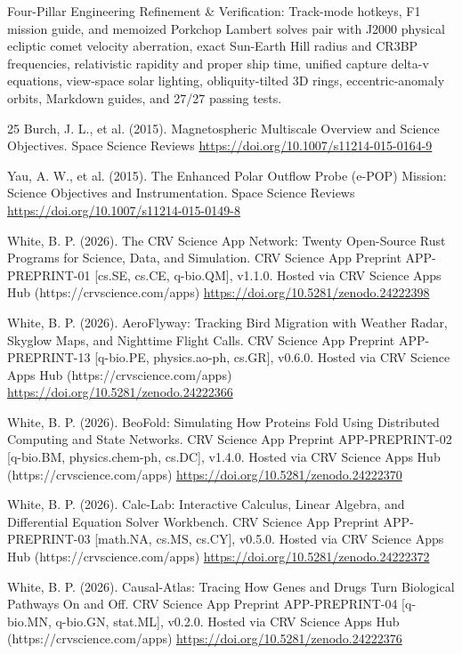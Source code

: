 \documentclass[10pt,letterpaper]{article}
\begin{document}
Four-Pillar Engineering Refinement \& Verification: Track-mode hotkeys, F1 mission guide, and memoized Porkchop Lambert solves pair with J2000 physical ecliptic comet velocity aberration, exact Sun-Earth Hill radius and CR3BP frequencies, relativistic rapidity and proper ship time, unified capture delta-v equations, view-space solar lighting, obliquity-tilted 3D rings, eccentric-anomaly orbits, Markdown guides, and 27/27 passing tests.

\begin{thebibliography}{25}
 Burch, J. L., et al. (2015). Magnetospheric Multiscale Overview and Science Objectives. Space Science Reviews \url{https://doi.org/10.1007/s11214-015-0164-9}

 Yau, A. W., et al. (2015). The Enhanced Polar Outflow Probe (e-POP) Mission: Science Objectives and Instrumentation. Space Science Reviews \url{https://doi.org/10.1007/s11214-015-0149-8}

 White, B. P. (2026). The CRV Science App Network: Twenty Open-Source Rust Programs for Science, Data, and Simulation. CRV Science App Preprint APP-PREPRINT-01 [cs.SE, cs.CE, q-bio.QM], v1.1.0. Hosted via CRV Science Apps Hub (https://crvscience.com/apps) \url{https://doi.org/10.5281/zenodo.24222398}

 White, B. P. (2026). AeroFlyway: Tracking Bird Migration with Weather Radar, Skyglow Maps, and Nighttime Flight Calls. CRV Science App Preprint APP-PREPRINT-13 [q-bio.PE, physics.ao-ph, cs.GR], v0.6.0. Hosted via CRV Science Apps Hub (https://crvscience.com/apps) \url{https://doi.org/10.5281/zenodo.24222366}

 White, B. P. (2026). BeoFold: Simulating How Proteins Fold Using Distributed Computing and State Networks. CRV Science App Preprint APP-PREPRINT-02 [q-bio.BM, physics.chem-ph, cs.DC], v1.4.0. Hosted via CRV Science Apps Hub (https://crvscience.com/apps) \url{https://doi.org/10.5281/zenodo.24222370}

 White, B. P. (2026). Calc-Lab: Interactive Calculus, Linear Algebra, and Differential Equation Solver Workbench. CRV Science App Preprint APP-PREPRINT-03 [math.NA, cs.MS, cs.CY], v0.5.0. Hosted via CRV Science Apps Hub (https://crvscience.com/apps) \url{https://doi.org/10.5281/zenodo.24222372}

 White, B. P. (2026). Causal-Atlas: Tracing How Genes and Drugs Turn Biological Pathways On and Off. CRV Science App Preprint APP-PREPRINT-04 [q-bio.MN, q-bio.GN, stat.ML], v0.2.0. Hosted via CRV Science Apps Hub (https://crvscience.com/apps) \url{https://doi.org/10.5281/zenodo.24222376}


\end{thebibliography}
\end{document}
